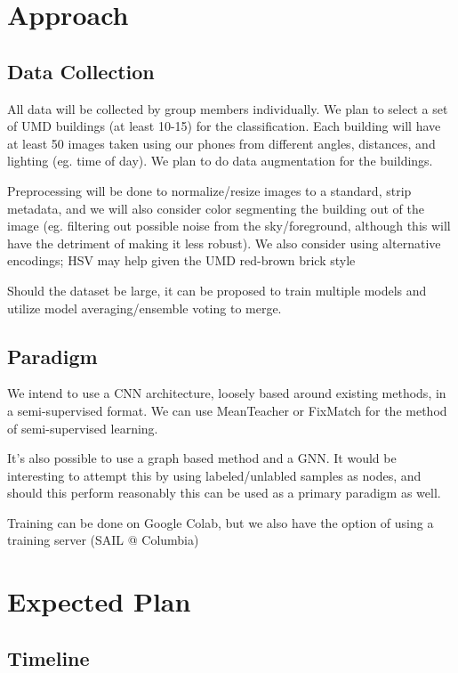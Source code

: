 \documentclass{article}
\begin{document}
\section{Approach}
\label{approach}

\subsection{Data Collection}

All data will be collected by group members individually. We plan to select a set of UMD buildings (at least 10-15) for the classification. Each building will have at least 50 images taken using our phones from different angles, distances, and lighting (eg. time of day). We plan to do data augmentation for the buildings. 

Preprocessing will be done to normalize/resize images to a standard, strip metadata, and we will also consider color segmenting the building out of the image (eg. filtering out possible noise from the sky/foreground, although this will have the detriment of making it less robust). We also consider using alternative encodings; HSV may help given the UMD red-brown brick style

Should the dataset be large, it can be proposed to train multiple models and utilize model averaging/ensemble voting to merge.

\subsection{Paradigm}

We intend to use a CNN architecture, loosely based around existing methods, in a semi-supervised format. We can use MeanTeacher or FixMatch for the method of semi-supervised learning.

It's also possible to use a graph based method and a GNN. It would be interesting to attempt this by using labeled/unlabled samples as nodes, and should this perform reasonably this can be used as a primary paradigm as well.

Training can be done on Google Colab, but we also have the option of using a training server (SAIL @ Columbia)

\section{Expected Plan}
\label{plan}

\subsection{Timeline}
\end{document}
